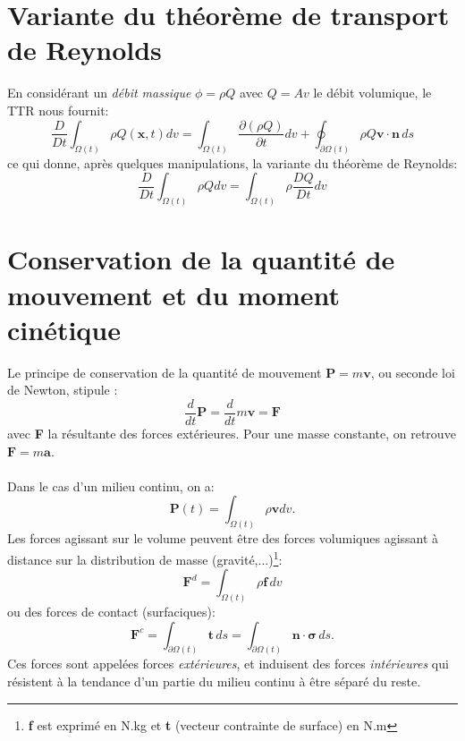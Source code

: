 \section{Variante du théorème de transport de Reynolds}
En considérant un \emph{débit massique} $\phi=\rho Q$ avec $Q=Av$ le débit volumique, le TTR nous fournit: 
$$\frac{D}{Dt}\int_{\Omega (t)}\rho Q(\textbf{x},t)dv=\int_{\Omega (t)}\frac{\partial(\rho Q)}{\partial t}dv+\oint_{\partial \Omega (t)}\rho Q\textbf{v}\cdot\textbf{\^n}\,ds$$ ce qui donne, après quelques manipulations, la variante du théorème de Reynolds: 
\begin{equation}\label{ttr2}\boxed{\frac{D}{Dt}\int_{\Omega (t)}\rho Qdv=\int_{\Omega(t)}\rho\frac{DQ}{Dt}dv}\end{equation}

\section{Conservation de la quantité de mouvement et du moment cinétique}
Le principe de conservation de la quantité de mouvement $\textbf{P}=m\textbf{v}$, ou seconde loi de Newton, stipule : $$\frac{d}{dt}\textbf{P}=\frac{d}{dt}m\textbf{v}=\textbf{F}$$ avec \textbf{F} la résultante des forces extérieures. Pour une masse constante, on retrouve $\textbf{F}=m\textbf{a}$.
\paragraph{}
Dans le cas d'un milieu continu, on a: $$\textbf{P}(t)=\int_{\Omega(t)}\rho\textbf{v}dv.$$
Les forces agissant sur le volume peuvent être des forces volumiques agissant à distance sur la distribution de masse (gravité,...)\footnote{\textbf{f} est exprimé en N.kg et \textbf{t} (vecteur contrainte de surface) en N.m}: $$\textbf{F}^d=\int_{\Omega (t)}\rho\textbf{f}\,dv$$  ou des forces de contact (surfaciques): $$\textbf{F}^c=\int_{\partial \Omega (t)}\textbf{t}\,ds=\int_{\partial \Omega (t)}\textbf{\^n}\cdot\boldsymbol{\sigma}\,ds.$$ Ces forces sont appelées forces \emph{extérieures}, et induisent des forces \emph{intérieures} qui résistent à la tendance d'un partie du milieu continu à être séparé du reste.
